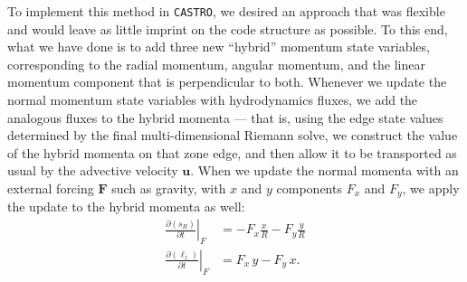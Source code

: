 \documentclass[twocolumn,numberedappendix]{../aastex60}
\newcommand{\castro}{\texttt{CASTRO}}
\begin{document}
To implement this method in \castro, we desired an approach that was flexible
and would leave as little imprint on the code structure as possible.
To this end, what we have done is to add three new ``hybrid'' momentum state
variables, corresponding to the radial momentum, angular momentum, and the linear
momentum component that is perpendicular to both. Whenever we update the normal
momentum state variables with hydrodynamics fluxes, we add the analogous fluxes
to the hybrid momenta --- that is, using the edge state values determined by the
final multi-dimensional Riemann solve, we construct the value of the hybrid
momenta on that zone edge, and then allow it to be transported as usual by the
advective velocity $\mathbf{u}$. When we update the normal momenta with an
external forcing $\mathbf{F}$ such as gravity, with $x$ and $y$
components $F_x$ and $F_y$, we apply the update to the hybrid momenta as well:
\begin{align}
  \left.\frac{\partial(s_R)}{\partial t}\right|_{F} &= -F_x \frac{x}{R} - F_y\frac{y}{R} \label{eq:force-radial}\\
  \left.\frac{\partial(\ell_z)}{\partial t}\right|_{F} &= F_x\, y - F_y\, x.\label{eq:force-angular}
  \end{align}
\end{document}
